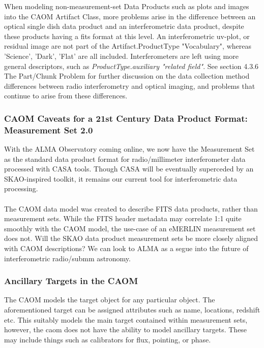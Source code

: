 When modeling non-measurement-set Data Products such as plots and images into the CAOM Artifact Class, more problems arise in the difference between an optical single dish data product and an interferometric data product, despite these products having a fits format at this level.  An interferometric uv-plot, or residual image are not part of the Artifact.ProductType "Vocabulary", whereas 'Science', 'Dark', 'Flat' are all included.  Interferometers are left using more general descriptors, such as \textit{ProductType.auxiliary "related field"}. See section 4.3.6 The Part/Chunk Problem for further discussion on the data collection method differences between radio interferometry and optical imaging, and problems that continue to arise from these differences. 

\subsubsection{CAOM Caveats for a 21st Century Data Product Format: Measurement Set 2.0}
With the ALMA Observatory coming online, we now have the Measurement Set as the standard data product format for radio/millimeter interferometer data processed with CASA tools.  Though CASA will be eventually superceded by an SKAO-inspired toolkit, it remains our current tool for interferometric data processing.  
\\
\\The CAOM data model was created to describe FITS data products, rather than measurement sets.  While the FITS header metadata may correlate 1:1 quite smoothly with the CAOM model, the use-case of an eMERLIN measurement set does not.  Will the SKAO data product measurement sets be more closely aligned with CAOM descriptions?   We can look to ALMA as a segue into the future of interferometric radio/submm astronomy.

\subsubsection{Ancillary Targets in the CAOM}

The CAOM models the target object for any particular object. 
The aforementioned target can be assigned attributes such as name, locations, redshift etc. 
This suitably models the main target contained within measurement sets, however, the caom does not have the ability to model ancillary targets.
These may include things such as calibrators for flux, pointing, or phase. 


